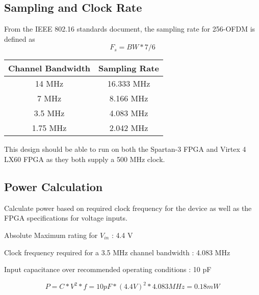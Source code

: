 \documentclass[dvips,10pt,twocolumn]{article}
\begin{document}
  \subsection{Sampling and Clock Rate}
    From the IEEE 802.16 standards document, the sampling rate for 256-OFDM is defined as
    \begin{equation}
    F_s = BW * 7/6
    \end{equation}
  
  \begin{center}
  \begin{tabular}{c|c}
  Channel Bandwidth & Sampling Rate \\ \hline
  14 MHz & 16.333 MHz \\
  7 MHz & 8.166 MHz \\
  3.5 MHz & 4.083 MHz \\
  1.75 MHz & 2.042 MHz
  \end{tabular}
  \end{center}
  
  This design should be able to run on both the Spartan-3 FPGA and Virtex 4 LX60
  FPGA as they both supply a 500 MHz clock.
  
  \subsection{Power Calculation}
  
  Calculate power based on required clock frequency for the device as well as the
  FPGA specifications for voltage inputs.
  
  Absolute Maximum rating for $V_{in}$ : 4.4 V
  
  Clock frequency required for a 3.5 MHz channel bandwidth : 4.083 MHz
  
  Input capacitance over recommended operating conditions : 10 pF
  \begin{center}
  \begin{equation}
  P = C * V^2 * f = 10 pF * (4.4 V)^2 * 4.083 MHz = 0.18 mW
  \end{equation}
  \end{center}
  

{}

\end{document}
